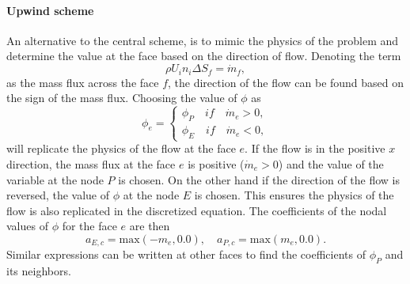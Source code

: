 \paragraph{Upwind scheme}
An alternative to the central scheme, is to mimic the physics of the problem and determine the value at the face based on the direction of flow. 
Denoting the term
\begin{equation*}
\rho U_i n_i \Delta S_f = \dot{m}_f,
\end{equation*}
as the mass flux across the face $f$, the direction of the flow can be found based on the sign of the mass flux. Choosing the value of $\phi$ as
\begin{equation}
\phi_e = \begin{cases}
\phi_P\quad if\quad \dot{m}_e > 0, \\
\phi_E\quad if\quad \dot{m}_e < 0,
\end{cases}
\end{equation}
will replicate the physics of the flow at the face $e$. If the flow is in the positive $x$ direction, the mass flux at the face $e$ is positive ($\dot{m}_e>0$) and the value of the variable at the node $P$ is chosen. On the other hand if the direction of the flow is reversed, the value of $\phi$ at the node $E$ is chosen. This ensures the physics of the flow is also replicated in the discretized equation. The coefficients of the nodal values of $\phi$ for the face $e$ are then
\begin{equation}
a_{E,c} = \text{max}(-m_e,0.0), \quad a_{P,c} = \text{max}(m_e,0.0).
\end{equation}
Similar expressions can be written at other faces to find the coefficients of $\phi_P$ and its neighbors.

